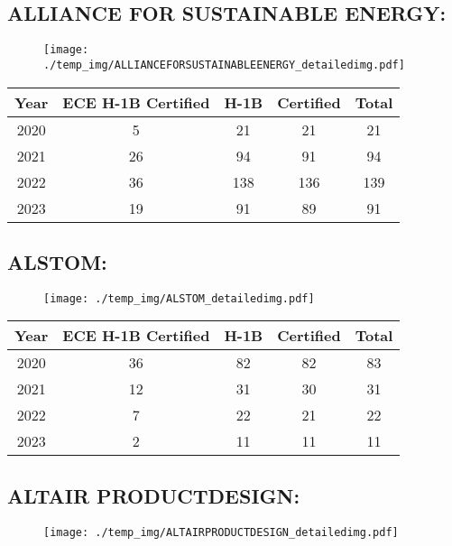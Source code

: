 \documentclass{article}%
\begin{document}
%
\newpage%
\subsection{ALLIANCE FOR SUSTAINABLE ENERGY:}%
\label{subsec:ALLIANCEFORSUSTAINABLEENERGY}%
\label{ALLIANCEFORSUSTAINABLEENERGYdetailed}%


\begin{figure}[htbp]%
\centering%
\texttt{[image: ./temp\_img/ALLIANCEFORSUSTAINABLEENERGY\_detailedimg.pdf]}%
\end{figure}

%
\begin{longtable}{c|c|c|c|c}%
\hline%
Year&ECE H{-}1B Certified&H{-}1B&Certified&Total\\%
\hline%
2020&5&21&21&21\\%
\hline%
2021&26&94&91&94\\%
\hline%
2022&36&138&136&139\\%
\hline%
2023&19&91&89&91\\%
\hline%
\end{longtable}

%
\newpage%
\subsection{ALSTOM:}%
\label{subsec:ALSTOM}%
\label{ALSTOMdetailed}%


\begin{figure}[htbp]%
\centering%
\texttt{[image: ./temp\_img/ALSTOM\_detailedimg.pdf]}%
\end{figure}

%
\begin{longtable}{c|c|c|c|c}%
\hline%
Year&ECE H{-}1B Certified&H{-}1B&Certified&Total\\%
\hline%
2020&36&82&82&83\\%
\hline%
2021&12&31&30&31\\%
\hline%
2022&7&22&21&22\\%
\hline%
2023&2&11&11&11\\%
\hline%
\end{longtable}

%
\newpage%
\subsection{ALTAIR PRODUCTDESIGN:}%
\label{subsec:ALTAIRPRODUCTDESIGN}%
\label{ALTAIRPRODUCTDESIGNdetailed}%


\begin{figure}[htbp]%
\centering%
\texttt{[image: ./temp\_img/ALTAIRPRODUCTDESIGN\_detailedimg.pdf]}%
\end{figure}
\end{document}
